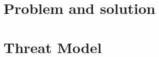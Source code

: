 \documentclass[conference]{IEEEtran}
\begin{document}
\section{Problem and solution}


\section{Threat Model}


\begin{figure}[t]
	\begin{subfigure}{0.24\textwidth}

\end{subfigure}
\end{figure}
\end{document}

